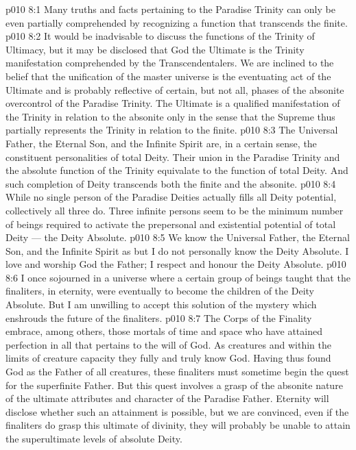 \vs p010 8:1 Many truths and facts pertaining to the Paradise Trinity can only be even partially comprehended by recognizing a function that transcends the finite.
\vs p010 8:2 It would be inadvisable to discuss the functions of the Trinity of Ultimacy, but it may be disclosed that God the Ultimate is the Trinity manifestation comprehended by the Transcendentalers. We are inclined to the belief that the unification of the master universe is the eventuating act of the Ultimate and is probably reflective of certain, but not all, phases of the absonite overcontrol of the Paradise Trinity. The Ultimate is a qualified manifestation of the Trinity in relation to the absonite only in the sense that the Supreme thus partially represents the Trinity in relation to the finite.
\vs p010 8:3 \pc The Universal Father, the Eternal Son, and the Infinite Spirit are, in a certain sense, the constituent personalities of total Deity. Their union in the Paradise Trinity and the absolute function of the Trinity equivalate to the function of total Deity. And such completion of Deity transcends both the finite and the absonite.
\vs p010 8:4 While no single person of the Paradise Deities actually fills all Deity potential, collectively all three do. Three infinite persons seem to be the minimum number of beings required to activate the prepersonal and existential potential of total Deity --- the Deity Absolute.
\vs p010 8:5 We know the Universal Father, the Eternal Son, and the Infinite Spirit as  but I do not personally know the Deity Absolute. I love and worship God the Father; I respect and honour the Deity Absolute.
\vs p010 8:6 \pc I once sojourned in a universe where a certain group of beings taught that the finaliters, in eternity, were eventually to become the children of the Deity Absolute. But I am unwilling to accept this solution of the mystery which enshrouds the future of the finaliters.
\vs p010 8:7 The Corps of the Finality embrace, among others, those mortals of time and space who have attained perfection in all that pertains to the will of God. As creatures and within the limits of creature capacity they fully and truly know God. Having thus found God as the Father of all creatures, these finaliters must sometime begin the quest for the superfinite Father. But this quest involves a grasp of the absonite nature of the ultimate attributes and character of the Paradise Father. Eternity will disclose whether such an attainment is possible, but we are convinced, even if the finaliters do grasp this ultimate of divinity, they will probably be unable to attain the superultimate levels of absolute Deity.
